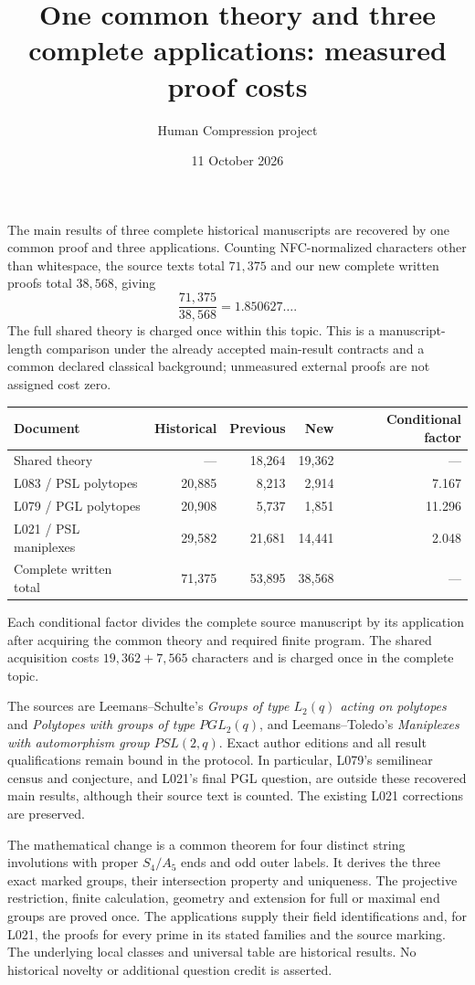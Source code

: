 \documentclass[11pt,a4paper]{article}
\title{One common theory and three complete applications: measured proof costs}
\author{Human Compression project}
\date{11 October 2026}
\begin{document}
\maketitle
\noindent The main results of three complete historical manuscripts are recovered by one common proof and three applications. Counting NFC-normalized characters other than whitespace, the source texts total $71{,}375$ and our new complete written proofs total $38{,}568$, giving
\[
 \frac{71{,}375}{38{,}568}=1.850627\ldots .
\]
The full shared theory is charged once within this topic. This is a manuscript-length comparison under the already accepted main-result contracts and a common declared classical background; unmeasured external proofs are not assigned cost zero.

\begin{center}\begin{tabular}{lrrrr}\toprule
Document & Historical & Previous & New & Conditional factor\\\midrule
Shared theory & --- & 18,264 & 19,362 & ---\\
L083 / PSL polytopes & 20,885 & 8,213 & 2,914 & 7.167\\
L079 / PGL polytopes & 20,908 & 5,737 & 1,851 & 11.296\\
L021 / PSL maniplexes & 29,582 & 21,681 & 14,441 & 2.048\\\midrule
Complete written total & 71,375 & 53,895 & 38,568 & ---\\\bottomrule
\end{tabular}\end{center}
Each conditional factor divides the complete source manuscript by its application after acquiring the common theory and required finite program. The shared acquisition costs $19{,}362+7{,}565$ characters and is charged once in the complete topic.

The sources are Leemans--Schulte's \emph{Groups of type $L_2(q)$ acting on polytopes} and \emph{Polytopes with groups of type $PGL_2(q)$}, and Leemans--Toledo's \emph{Maniplexes with automorphism group $PSL(2,q)$}. Exact author editions and all result qualifications remain bound in the protocol. In particular, L079's semilinear census and conjecture, and L021's final PGL question, are outside these recovered main results, although their source text is counted. The existing L021 corrections are preserved.

The mathematical change is a common theorem for four distinct string involutions with proper $S_4/A_5$ ends and odd outer labels. It derives the three exact marked groups, their intersection property and uniqueness. The projective restriction, finite calculation, geometry and extension for full or maximal end groups are proved once. The applications supply their field identifications and, for L021, the proofs for every prime in its stated families and the source marking. The underlying local classes and universal table are historical results. No historical novelty or additional question credit is asserted.
\end{document}
